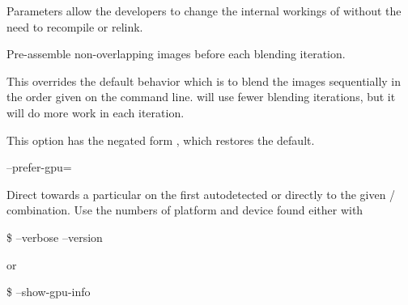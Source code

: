 \begin{codelist}
  Parameters allow the developers to change the internal workings of \App{} without the need to
  recompile or relink.

\begin{sgquote}

\end{sgquote}


\ifenblend
    \label{opt:pre-assemble}%
  \item[\itempar{-a \\ --pre-assemble}]\itemend
    Pre-assemble non-overlapping images before
    each blending iteration.

    This overrides
    the default behavior which is to blend the images sequentially in the order given on the
    command line.  \App{} will use fewer blending iterations, but it will do more work in each
    iteration.

    This option has the negated form %
    , which restores the default.
\fi


  \label{opt:prefer-gpu}%
\item[--prefer-gpu=\optional{\metavar{PLATFORM}:}\metavar{DEVICE}
  \restrictednote{\acronym{OpenCL}-enabled versions only.}]\itemend

  Direct \App{} towards a particular 
   on the first autodetected
   or directly to the given
  \slash{} combination.  Use the numbers of platform and device
  found either with

  \begin{terminal}
    \$ \app{} --verbose --version
  \end{terminal}
  or
  \begin{terminal}
    \$ \app{} --show-gpu-info
  \end{terminal}


\end{codelist}
